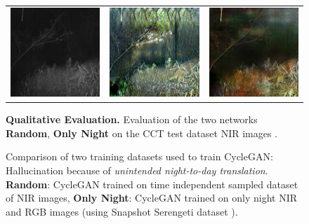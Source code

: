 \documentclass[a4paper,11pt, DIV=12]{scrartcl}
\begin{document}
\begin{figure}[h]
\begin{subtable}[h]{0.65\textwidth}
\begin{tabular}{c c c}
         \includegraphics[width=.3\textwidth]{img/588c13ba-23d2-11e8-a6a3-ec086b02610b_real.png} &
         \includegraphics[width=.3\textwidth]{img/588c13ba-23d2-11e8-a6a3-ec086b02610b_hal.png}  &
         \includegraphics[width=.3\textwidth]{img/588c13ba-23d2-11e8-a6a3-ec086b02610b_without_hal.png}
      \end{tabular}
      \caption{
         \textbf{Qualitative Evaluation.} Evaluation of the two networks \textbf{Random}, \textbf{Only Night} on the CCT test dataset NIR images \cite{caltech}.}
      \label{fig:hallucation-night-day-qual}
   \end{subtable}
   \caption{
      Comparison of two training datasets used to train CycleGAN: Hallucination because of \textit{unintended night-to-day translation}.
      \textbf{Random}: CycleGAN trained on time independent sampled dataset of NIR images,
      \textbf{Only Night}: CycleGAN trained on only night NIR and RGB images (using Snapshot Serengeti dataset \cite{serengeti}).
   }
   \label{fig:hallucincation-night-day}
\end{figure}
\end{document}
